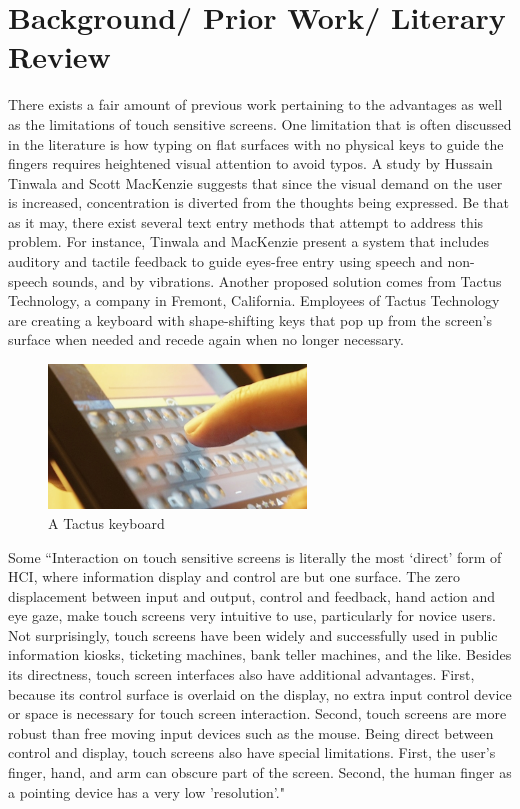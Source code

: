 \documentclass{article}
\begin{document}
\section{Background/ Prior Work/ Literary Review}
There exists a fair amount of previous work pertaining to the advantages as well as the limitations of touch sensitive screens. One limitation that is often discussed in the literature is how typing on flat surfaces with no physical keys to guide the fingers requires heightened visual attention to avoid typos. A study by Hussain Tinwala and Scott MacKenzie suggests that since the visual demand on the user is increased, concentration is diverted from the thoughts being expressed. \cite{Tinwala:2010:ETE:1868914.1868972} Be that as it may, there exist several text entry methods that attempt to address this problem. For instance, Tinwala and MacKenzie present a system that includes auditory and tactile feedback to guide eyes-free entry using speech and non-speech sounds, and by vibrations. \cite{Tinwala:2010:ETE:1868914.1868972} Another proposed solution comes from Tactus Technology, a company in Fremont, California. Employees of Tactus Technology are creating a keyboard with shape-shifting keys that pop up from the screen's surface when needed and recede again when no longer necessary.\cite{Tactus}
\begin{figure}[ht]
\centering
\includegraphics[width=2.7in]{tactus-keyboard.jpg} 

\caption{A Tactus keyboard}
\label{figure-sample}
\end{figure}

Some ``Interaction on touch sensitive screens is literally the most `direct' form of HCI, where information display and control are but one surface. The zero displacement between input and output, control and feedback, hand action and eye gaze, make touch screens very intuitive to use, particularly for novice users. Not surprisingly, touch screens have been widely and successfully used in public information kiosks, ticketing machines, bank teller machines, and the like. Besides its directness, touch screen interfaces also have additional advantages. First, because its control surface is overlaid on the display, no extra input control device or space is necessary for touch screen interaction. Second, touch screens are more robust than free moving input devices such as the mouse. Being direct between control and display, touch screens also have special limitations. First, the user's finger, hand, and arm can obscure part of the screen. Second, the human finger as a pointing device has a very low 'resolution'." 
\end{document}
